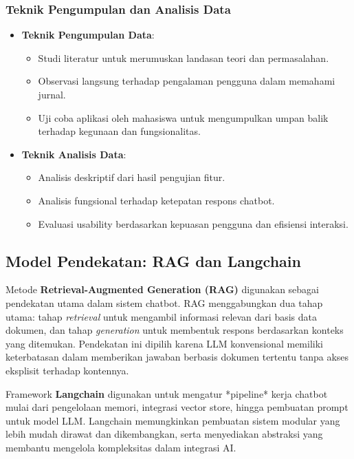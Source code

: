 \subsubsection*{Teknik Pengumpulan dan Analisis Data}

\begin{itemize}
  \item \textbf{Teknik Pengumpulan Data}:
        \begin{itemize}
          \item Studi literatur untuk merumuskan landasan teori dan permasalahan.
          \item Observasi langsung terhadap pengalaman pengguna dalam memahami jurnal.
          \item Uji coba aplikasi oleh mahasiswa untuk mengumpulkan umpan balik terhadap kegunaan dan fungsionalitas.
        \end{itemize}
  \item \textbf{Teknik Analisis Data}:
        \begin{itemize}
          \item Analisis deskriptif dari hasil pengujian fitur.
          \item Analisis fungsional terhadap ketepatan respons chatbot.
          \item Evaluasi usability berdasarkan kepuasan pengguna dan efisiensi interaksi.
        \end{itemize}
\end{itemize}

\subsection*{Model Pendekatan: RAG dan Langchain}

Metode \textbf{Retrieval-Augmented Generation (RAG)} digunakan sebagai pendekatan utama dalam sistem chatbot. RAG menggabungkan dua tahap utama: tahap \textit{retrieval} untuk mengambil informasi relevan dari basis data dokumen, dan tahap \textit{generation} untuk membentuk respons berdasarkan konteks yang ditemukan. Pendekatan ini dipilih karena LLM konvensional memiliki keterbatasan dalam memberikan jawaban berbasis dokumen tertentu tanpa akses eksplisit terhadap kontennya.

Framework \textbf{Langchain} digunakan untuk mengatur *pipeline* kerja chatbot mulai dari pengelolaan memori, integrasi vector store, hingga pembuatan prompt untuk model LLM. Langchain memungkinkan pembuatan sistem modular yang lebih mudah dirawat dan dikembangkan, serta menyediakan abstraksi yang membantu mengelola kompleksitas dalam integrasi AI.